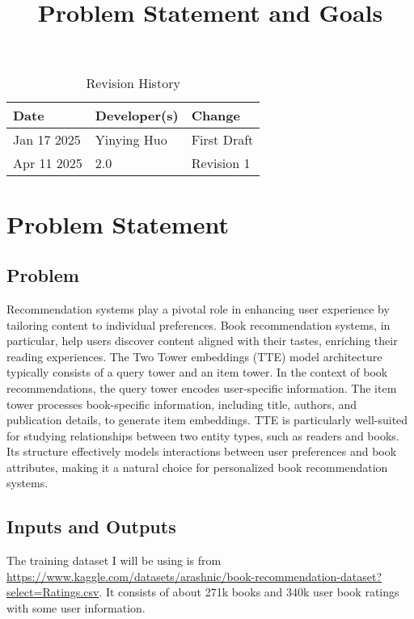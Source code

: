 \documentclass{article}
\title{Problem Statement and Goals\\\progname}
\author{\authname}
\date{}
\begin{document}
\maketitle

\begin{table}[hp]
\caption{Revision History} \label{TblRevisionHistory}
\begin{tabularx}{\textwidth}{llX}
\toprule
\textbf{Date} & \textbf{Developer(s)} & \textbf{Change}\\
\midrule
Jan 17 2025 & Yinying Huo & First Draft \\
Apr 11 2025 & 2.0 & Revision 1\\
\bottomrule
\end{tabularx}
\end{table}

\section{Problem Statement}

\subsection{Problem}
Recommendation systems play a pivotal role in enhancing user experience by tailoring content to individual preferences. Book recommendation systems, in particular, help users discover content aligned with their tastes, enriching their reading experiences. The Two Tower embeddings (TTE) model architecture typically consists of a query tower and an item tower. In the context of book recommendations, the query tower encodes user-specific information. The item tower processes book-specific information, including title, authors, and publication details, to generate item embeddings. TTE is particularly well-suited for studying relationships between two entity types, such as readers and books. Its structure effectively models interactions between user preferences and book attributes, making it a natural choice for personalized book recommendation systems.

\subsection{Inputs and Outputs}

The training dataset I will be using is from \url{https://www.kaggle.com/datasets/arashnic/book-recommendation-dataset?select=Ratings.csv}. It consists of about 271k books and 340k user book ratings with some user information.
\end{document}
